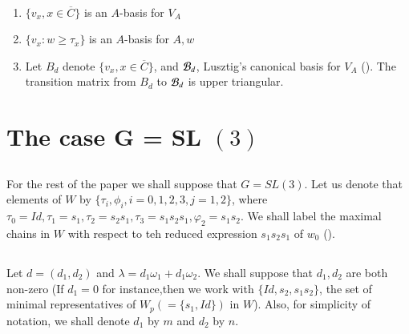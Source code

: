 \setcounter{definition}{14}
\begin{secconjs}\label{chap9-conjectures-3.15}
~\pageoriginale

\begin{enumerate}[(1)]
 \item $\{ v_{x}, x \in \overline{C}\}$ is an $A$-basis for $V_{A}$

 \item $\{v_{x}: w \geq \tau_{x}\}$ is an $A$-basis for ${A, w}$

 \item Let $B_{d}$ denote $\{v_{x}, x \in \overline{C}\}$, and $\mathcal{B}_{d}$, Lusztig's canonical basis for $V_{A}$ (\cite{chap9-keyL2}). The transition matrix from $B_{d}$ to $\mathcal{B}_{d}$ is upper triangular.
\end{enumerate}
\end{secconjs}

\section{The case G = SL $(3)$}\label{chap9-sec-4}

\subsection{}\label{chap9-subsec-4.1}
For the rest of the paper we shall suppose that $G=SL(3)$. Let us denote that elements of $W$ by $\{\tau_{i}, \phi_{i}, i=0,1,2,3, j=1,2\}$, where $\tau_{0} = Id, \tau_{1} =s_{1}, \tau_{2} =s_{2}s_{1}, \tau_{3} =s_{1}s_{2}s_{1}, \varphi_{2} =s_{1}s_{2}$.  We shall label the maximal chains in $W$ with respect to teh reduced expression $s_{1}s_{2}s_{1}$ of $w_{0}$ (\cite{chap9-keyB-W}). 

\subsection{}\label{chap9-subsec-4.2}
Let $d=(d_{1}, d_{2})$ and $\lambda = d_{1}\omega_{1} + d_{1}\omega_{2}$. We shall suppose that $d_{1}, d_{2}$ are both non-zero (If $d_{1}=0$ for instance,then we work with $\{Id, s_{2}, s_{1}s_{2}\}$, the set of minimal representatives of $W_{p}(=\{s_{1}, Id\})$ in $W$). Also, for simplicity of notation, we shall denote $d_{1}$ by $m$ and $d_{2}$ by $n$.

\subsection{}\label{chap9-subsec-4.3}

